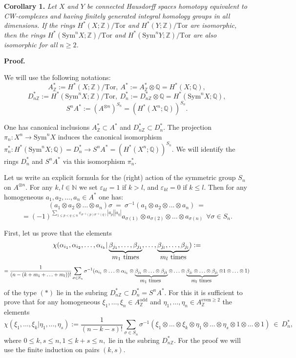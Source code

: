 \documentclass[a4paper,14pt]{article}
\newcommand{\Sym}{\mathrm{Sym}}
\newcommand{\Tor}{\mathrm{Tor}}
\newcommand{\odd}{\mathrm{odd}}
\newcommand{\even}{\mathrm{even}}
\newcommand{\Q}{\mathbb{Q}}
\newcommand{\Z}{\mathbb{Z}}
\begin{document}
\textbf{Corollary 1.} {\it Let $X$ and $Y$ be connected Hausdorff spaces homotopy equivalent to CW-complexes and having finitely generated integral homology groups in all dimensions. If the rings $H^*(X;\Z)/\Tor$ and $H^*(Y;\Z)/\Tor$ are isomorphic, then the rings $H^*(\Sym^n X;\Z)/\Tor$ and $H^*(\Sym^n Y;\Z)/\Tor$ are also isomorphic for all $n\ge 2$.}



\textbf{Proof.}

We will use the following notations:
$$
A^*_{\Z}:= H^*(X;\Z)/\Tor,  \  A^*:=A^*_{\Z}\otimes \Q=H^*(X;\Q), 
$$
$$ 
D^*_{n\Z}:=H^*(\Sym^n X;\Z)/\Tor,  \  D^*_n:=D^*_{n\Z}\otimes \Q =H^*(\Sym^n X;\Q),
$$
$$
S^nA^*:= (A^{\otimes n})^{S_n}= (H^*(X^n;\Q))^{S_n}.
$$

One has canonical inclusions $A^*_{\Z}\subset A^*$ and $D^*_{n\Z}\subset D^*_n$. The projection $\pi_n:X^n\rightarrow \Sym^n X$ induces the canonical isomorphism $\pi_n^*:H^*(\Sym^n X;\Q)=D^*_n\rightarrow S^nA^*=(H^*(X^n;\Q))^{S_n}$. We will identify the rings $D^*_n$ and $S^nA^*$ via this isomorphism $\pi^*_n$. 

Let us write an explicit formula for the (right) action of the symmetric group $S_n$ on $A^{\otimes n}$.  For any $k,l\in \mathbb{N}$ we set $\varepsilon_{kl}=1$ if $k>l$, and $\varepsilon_{kl}=0$ if $k\le l$. Then for any homogeneous $a_1,a_2,\ldots, a_n\in A^*$ one has:
$$
(a_1\otimes a_2\otimes \ldots\otimes a_n)\sigma  \  = \    \sigma^{-1} (a_1\otimes a_2\otimes \ldots\otimes a_n) \  =   
$$
$$
= (-1)^{\sum_{1\le p< q\le n} \varepsilon_{\sigma^{-1}(p)\sigma^{-1}(q)} |a_p||a_q| } a_{\sigma(1)}\otimes a_{\sigma(2)}\otimes \ldots\otimes a_{\sigma(n)}   \  \  \forall \sigma\in S_n.
$$

First, let us prove that the elements
$$
\chi(\alpha_{i_1},\alpha_{i_2},\ldots,\alpha_{i_k}  |  \underbrace{\beta_{j_1},\ldots,\beta_{j_1}}_{\mbox{$m_1$ \text{times}}},\ldots, \underbrace{\beta_{j_l},\ldots,\beta_{j_l}}_{\mbox{$m_l$ \text{times}}}  ) :=
$$
$$
= \frac{1}{(n-(k+m_1+\ldots+m_l))!} \sum_{\sigma\in S_n} \sigma^{-1} (\alpha_{i_1} \otimes \ldots \otimes  \alpha_{i_k} \otimes \underbrace{\beta_{j_1} \otimes \ldots \otimes \beta_{j_1}}_{ \mbox{$m_1$ \text{times} } } \otimes \ldots  \otimes \underbrace{ \beta_{j_l} \otimes \ldots \otimes \beta_{j_l} }_{ \mbox{$m_l$ \text{times} } }\otimes  1\otimes \ldots \otimes 1 )
$$
of the type $(*)$ lie in the subring $D^*_{n\Z}\subset D^*_n=S^nA^*$. For this it is sufficient to prove that for any homogeneous $\xi_1,\ldots,\xi_n\in A^{\odd}_{\Z}$ and $\eta_1,\ldots,\eta_n\in A^{\even \ge 2}_{\Z}$ the elements
$$
\chi(\xi_1,\ldots,\xi_k | \eta_1,\ldots,\eta_s) := \frac{1}{(n-k-s)!} \sum_{\sigma \in S_n}  \sigma^{-1}(\xi_1\otimes \ldots\otimes \xi_k \otimes \eta_1\otimes \ldots\otimes \eta_s\otimes 1\otimes \ldots \otimes 1)  \  \in \  D^*_n,
$$
where $0\le k,s\le n, 1\le k+s\le n,$ lie in the subring $D^*_{n\Z}$. For the proof we will use the finite induction on pairs $(k,s)$. 
\end{document}
